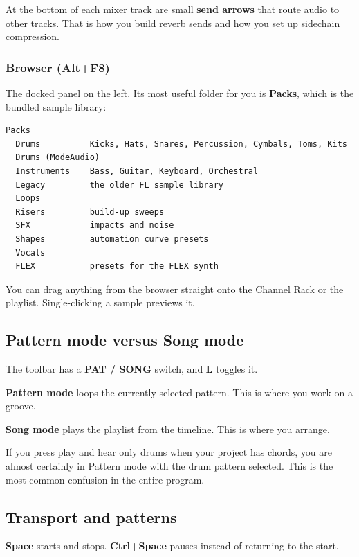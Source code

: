 At the bottom of each mixer track are small \textbf{send arrows} that route audio to other tracks.
That is how you build reverb sends and how you set up sidechain compression.

\subsubsection{Browser (Alt+F8)}\label{fl01_interface-browser-altf8}

The docked panel on the left. Its most useful folder for you is \textbf{Packs}, which is the
bundled sample library:

\begin{verbatim}
Packs
  Drums          Kicks, Hats, Snares, Percussion, Cymbals, Toms, Kits
  Drums (ModeAudio)
  Instruments    Bass, Guitar, Keyboard, Orchestral
  Legacy         the older FL sample library
  Loops
  Risers         build-up sweeps
  SFX            impacts and noise
  Shapes         automation curve presets
  Vocals
  FLEX           presets for the FLEX synth
\end{verbatim}

You can drag anything from the browser straight onto the Channel Rack or the playlist.
Single-clicking a sample previews it.

\subsection{Pattern mode versus Song mode}\label{fl01_interface-pattern-mode-versus-song-mode}

The toolbar has a \textbf{PAT / SONG} switch, and \textbf{L} toggles it.

\textbf{Pattern mode} loops the currently selected pattern. This is where you work on a groove.

\textbf{Song mode} plays the playlist from the timeline. This is where you arrange.

If you press play and hear only drums when your project has chords, you are almost certainly
in Pattern mode with the drum pattern selected. This is the most common confusion in the
entire program.

\subsection{Transport and patterns}\label{fl01_interface-transport-and-patterns}

\textbf{Space} starts and stops. \textbf{Ctrl+Space} pauses instead of returning to the start.

